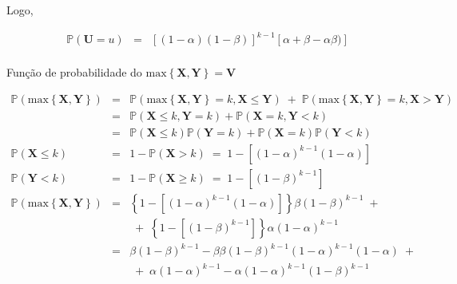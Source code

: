 \documentclass[a4paper, 11pt]{article}
\begin{document}
Logo, 

\begin{equation*}
\begin{array}{lclll}

\mathds{P}(\mathbf{U} = u) & = &  \left[ (1-\alpha)(1-\beta) \right]^{k-1}\left[ \alpha + \beta -\alpha\beta) \right] \\[10pt]

\end{array}
\end{equation*}

Função de probabilidade do $\mathrm{max}\left\{ \mathbf{X}, \mathbf{Y} \right\} = \mathbf{V}$

\begin{equation*}
\begin{array}{lclll}
\mathds{P}(\mathrm{max}\left\{ \mathbf{X}, \mathbf{Y} \right\}) & = &  \mathds{P}(\mathrm{max}\left\{ \mathbf{X}, \mathbf{Y} \right\} = k, \mathbf{X} \leq \mathbf{Y}) \; + \; \mathds{P}(\mathrm{max}\left\{ \mathbf{X}, \mathbf{Y} \right\} = k, \mathbf{X} > \mathbf{Y}) \\

& = & \mathds{P}(\mathbf{X} \leq k, \mathbf{Y} = k) + \mathds{P}(\mathbf{X} = k, \mathbf{Y} < k) \\

& = & \mathds{P}(\mathbf{X} \leq k) \mathds{P}(\mathbf{Y} = k) + \mathds{P}(\mathbf{X} = k)\mathds{P}(\mathbf{Y} < k) \\[25pt]

\mathds{P}(\mathbf{X} \leq k) & = & 1 - \mathds{P}(\mathbf{X} > k) \; = \; 1 - \left[ (1-\alpha)^{k-1}(1-\alpha)\right] \\[25pt]

\mathds{P}(\mathbf{Y} < k) & = & 1 - \mathds{P}(\mathbf{X} \geq k) \; = \; 1 - \left[ (1-\beta)^{k-1}\right] \\[25pt]

\mathds{P}(\mathrm{max}\left\{ \mathbf{X}, \mathbf{Y} \right\}) & = & \left\{ 1 - \left[ (1-\alpha)^{k-1}(1-\alpha)\right]\right\} \beta(1-\beta)^{k-1} \; + \;  \\

& & \; + \; \left\{1 - \left[(1-\beta)^{k-1}\right]\right\}\alpha(1-\alpha)^{k-1}\\

& = & \beta(1-\beta)^{k-1} - \beta\beta(1-\beta)^{k-1}(1-\alpha)^{k-1}(1-\alpha) \; + \\
& & \; + \; \alpha(1-\alpha)^{k-1} - \alpha(1-\alpha)^{k-1}(1-\beta)^{k-1} \\


\end{array}
\end{equation*}
\end{document}
